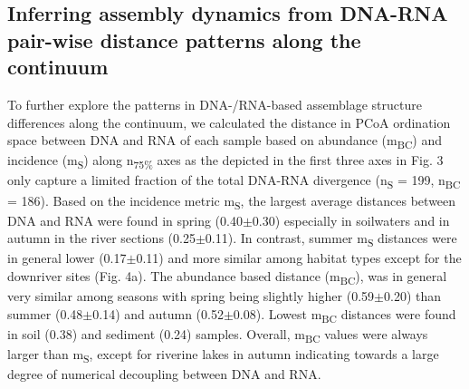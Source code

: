 \documentclass[12pt,a4paper]{article} %
\begin{document}
\subsection*{Inferring assembly dynamics from DNA-RNA pair-wise distance patterns along the continuum}
To further explore the patterns in DNA-/RNA-based assemblage structure differences along the continuum, we calculated the distance in PCoA ordination space between DNA and RNA of each sample based on abundance (m\textsubscript{BC}) and incidence (m\textsubscript{S}) along n\textsubscript{75\%} axes as the depicted in the first three axes in Fig. 3 only capture a limited fraction of the total DNA-RNA divergence (n\textsubscript{S} = 199, n\textsubscript{BC} = 186). Based on the incidence metric m\textsubscript{S}, the largest average distances between DNA and RNA were found in spring (0.40$\pm$0.30) especially in soilwaters and in autumn in the river sections (0.25$\pm$0.11). In contrast, summer m\textsubscript{S} distances were in general lower (0.17$\pm$0.11) and more similar among habitat types except for the downriver sites (Fig. 4a). The abundance based distance (m\textsubscript{BC}), was in general very similar among seasons with spring being slightly higher (0.59$\pm$0.20) than summer (0.48$\pm$0.14) and autumn (0.52$\pm$0.08). Lowest m\textsubscript{BC} distances were found in soil (0.38) and sediment (0.24) samples. Overall, m\textsubscript{BC} values were always larger than m\textsubscript{S}, except for riverine lakes in autumn indicating towards a large degree of numerical decoupling between DNA and RNA.
\end{document}
